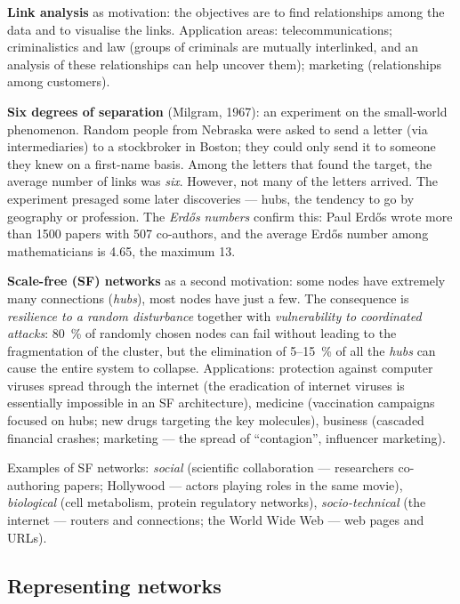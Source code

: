 \documentclass[11pt,a4paper]{article}
\theoremstyle{definition}
\providecommand{\uv}[1]{``#1''}
\begin{document}
\textbf{Link analysis} as motivation: the objectives are to find relationships among the data and to
visualise the links. Application areas: telecommunications; criminalistics and law (groups of
criminals are mutually interlinked, and an analysis of these relationships can help uncover them);
marketing (relationships among customers).

\textbf{Six degrees of separation} (Milgram, 1967): an experiment on the small-world phenomenon.
Random people from Nebraska were asked to send a letter (via intermediaries) to a stockbroker in
Boston; they could only send it to someone they knew on a first-name basis. Among the letters that
found the target, the average number of links was \emph{six}. However, not many of the letters
arrived. The experiment presaged some later discoveries --- hubs, the tendency to go by geography or
profession. The \emph{Erdős numbers} confirm this: Paul Erdős wrote more than 1500 papers with 507
co-authors, and the average Erdős number among mathematicians is 4.65, the maximum 13.

\textbf{Scale-free (SF) networks} as a second motivation: some nodes have extremely many connections
(\emph{hubs}), most nodes have just a few. The consequence is \emph{resilience to a random
disturbance} together with \emph{vulnerability to coordinated attacks}: 80~\% of randomly chosen
nodes can fail without leading to the fragmentation of the cluster, but the elimination of 5--15~\%
of all the \emph{hubs} can cause the entire system to collapse. Applications: protection against
computer viruses spread through the internet (the eradication of internet viruses is essentially
impossible in an SF architecture), medicine (vaccination campaigns focused on hubs; new drugs
targeting the key molecules), business (cascaded financial crashes; marketing --- the spread of
\uv{contagion}, influencer marketing).

Examples of SF networks: \emph{social} (scientific collaboration --- researchers co-authoring
papers; Hollywood --- actors playing roles in the same movie), \emph{biological} (cell metabolism,
protein regulatory networks), \emph{socio-technical} (the internet --- routers and connections; the
World Wide Web --- web pages and URLs).

\subsection{Representing networks}
\end{document}
